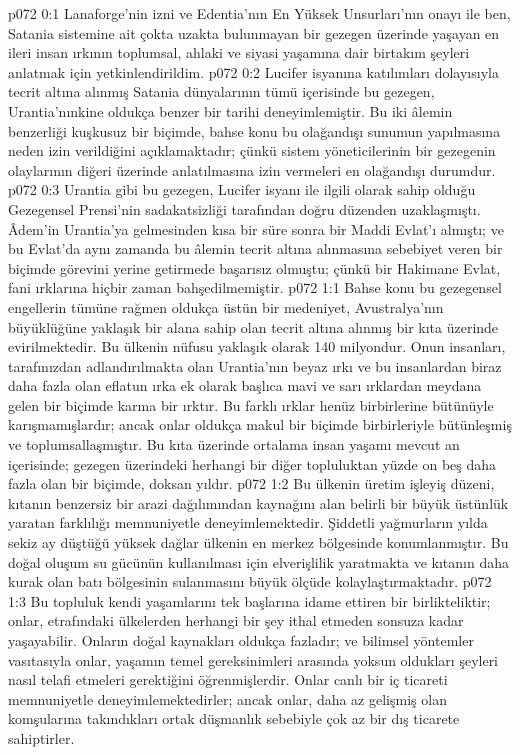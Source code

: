 \vs p072 0:1 Lanaforge’nin izni ve Edentia’nın En Yüksek Unsurları’nın onayı ile ben, Satania sistemine ait çokta uzakta bulunmayan bir gezegen üzerinde yaşayan en ileri insan ırkının toplumsal, ahlaki ve siyasi yaşamına dair birtakım şeyleri anlatmak için yetkinlendirildim.
\vs p072 0:2 Lucifer isyanına katılımları dolayısıyla tecrit altına alınmış Satania dünyalarının tümü içerisinde bu gezegen, Urantia’nınkine oldukça benzer bir tarihi deneyimlemiştir. Bu iki âlemin benzerliği kuşkusuz bir biçimde, bahse konu bu olağandışı sunumun yapılmasına neden izin verildiğini açıklamaktadır; çünkü sistem yöneticilerinin bir gezegenin olaylarının diğeri üzerinde anlatılmasına izin vermeleri en olağandışı durumdur.
\vs p072 0:3 Urantia gibi bu gezegen, Lucifer isyanı ile ilgili olarak sahip olduğu Gezegensel Prensi’nin sadakatsizliği tarafından doğru düzenden uzaklaşmıştı. Âdem’in Urantia’ya gelmesinden kısa bir süre sonra bir Maddi Evlat’ı almıştı; ve bu Evlat’da aynı zamanda bu âlemin tecrit altına alınmasına sebebiyet veren bir biçimde görevini yerine getirmede başarısız olmuştu; çünkü bir Hakimane Evlat, fani ırklarına hiçbir zaman bahşedilmemiştir.
\vs p072 1:1 Bahse konu bu gezegensel engellerin tümüne rağmen oldukça üstün bir medeniyet, Avustralya’nın büyüklüğüne yaklaşık bir alana sahip olan tecrit altına alınmış bir kıta üzerinde evirilmektedir. Bu ülkenin nüfusu yaklaşık olarak 140 milyondur. Onun insanları, tarafınızdan adlandırılmakta olan Urantia’nın beyaz ırkı ve bu insanlardan biraz daha fazla olan eflatun ırka ek olarak başlıca mavi ve sarı ırklardan meydana gelen bir biçimde karma bir ırktır. Bu farklı ırklar henüz birbirlerine bütünüyle karışmamışlardır; ancak onlar oldukça makul bir biçimde birbirleriyle bütünleşmiş ve toplumsallaşmıştır. Bu kıta üzerinde ortalama insan yaşamı mevcut an içerisinde; gezegen üzerindeki herhangi bir diğer topluluktan yüzde on beş daha fazla olan bir biçimde, doksan yıldır.
\vs p072 1:2 Bu ülkenin üretim işleyiş düzeni, kıtanın benzersiz bir arazi dağılımından kaynağını alan belirli bir büyük üstünlük yaratan farklılığı memnuniyetle deneyimlemektedir. Şiddetli yağmurların yılda sekiz ay düştüğü yüksek dağlar ülkenin en merkez bölgesinde konumlanmıştır. Bu doğal oluşum su gücünün kullanılması için elverişlilik yaratmakta ve kıtanın daha kurak olan batı bölgesinin sulanmasını büyük ölçüde kolaylaştırmaktadır.
\vs p072 1:3 Bu topluluk kendi yaşamlarını tek başlarına idame ettiren bir birlikteliktir; onlar, etrafındaki ülkelerden herhangi bir şey ithal etmeden sonsuza kadar yaşayabilir. Onların doğal kaynakları oldukça fazladır; ve bilimsel yöntemler vasıtasıyla onlar, yaşamın temel gereksinimleri arasında yoksun oldukları şeyleri nasıl telafi etmeleri gerektiğini öğrenmişlerdir. Onlar canlı bir iç ticareti memnuniyetle deneyimlemektedirler; ancak onlar, daha az gelişmiş olan komşularına takındıkları ortak düşmanlık sebebiyle çok az bir dış ticarete sahiptirler.
